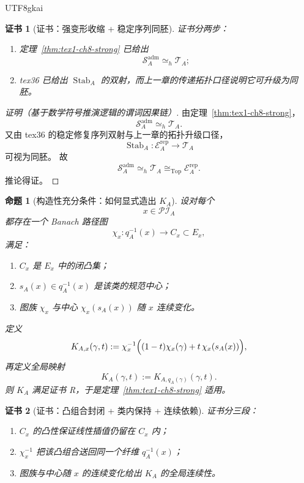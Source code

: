 \documentclass[12pt]{article}
\newtheorem{proposition}{命题}[section]
\newtheorem{Certificate}{证书}[section]
\begin{document}
\begin{CJK*}{UTF8}{gkai}
\begin{Certificate}[证书：强变形收缩 + 稳定序列同胚]
\label{cert:tex1-ch8-rep}
证书分两步：
\begin{enumerate}
  \item 定理~\ref{thm:tex1-ch8-strong} 已给出
  \[
    \mathcal S_A^{\mathrm{adm}}\simeq_h \mathcal T_A;
  \]
  \item tex36 已给出 \(\operatorname{Stab}_A\) 的双射，而上一章的传递拓扑口径说明它可升级为同胚。
\end{enumerate}
\end{Certificate}

\begin{proof}[证明（基于数学符号推演逻辑的谓词因果链）]
由定理~\ref{thm:tex1-ch8-strong}，
\[
  \mathcal S_A^{\mathrm{adm}}\simeq_h \mathcal T_A.
\]
又由 tex36 的稳定修复序列双射与上一章的拓扑升级口径，
\[
  \operatorname{Stab}_A:\mathcal E_A^{\mathrm{rep}}\to \mathcal T_A
\]
可视为同胚。
故
\[
  \mathcal S_A^{\mathrm{adm}}
  \simeq_h
  \mathcal T_A
  \cong_{\mathrm{Top}}
  \mathcal E_A^{\mathrm{rep}}.
\]
推论得证。
\end{proof}

\begin{proposition}[构造性充分条件：如何显式造出 \(K_A\)]
\label{prop:tex1-ch8-constructive}
设对每个
\[
  x\in \mathcal{PI}_A
\]
都存在一个 Banach 路径图
\[
  \chi_x:q_A^{-1}(x)\to C_x\subset E_x,
\]
满足：
\begin{enumerate}
  \item \(C_x\) 是 \(E_x\) 中的闭凸集；
  \item \(s_A(x)\in q_A^{-1}(x)\) 是该类的规范中心；
  \item 图族 \(\chi_x\) 与中心 \(\chi_x(s_A(x))\) 随 \(x\) 连续变化。
\end{enumerate}
定义
\[
  K_{A,x}(\gamma,t)
  :=
  \chi_x^{-1}
  \Bigl(
    (1-t)\chi_x(\gamma)+t\,\chi_x(s_A(x))
  \Bigr),
\]
再定义全局映射
\[
  K_A(\gamma,t)
  :=
  K_{A,q_A(\gamma)}(\gamma,t).
\]
则 \(K_A\) 满足证书 R，于是定理~\ref{thm:tex1-ch8-strong} 适用。
\end{proposition}

\begin{Certificate}[证书：凸组合封闭 + 类内保持 + 连续依赖]
\label{cert:tex1-ch8-constructive}
证书分三段：
\begin{enumerate}
  \item \(C_x\) 的凸性保证线性插值仍留在 \(C_x\) 内；
  \item \(\chi_x^{-1}\) 把该凸组合送回同一个纤维 \(q_A^{-1}(x)\)；
  \item 图族与中心随 \(x\) 的连续变化给出 \(K_A\) 的全局连续性。
\end{enumerate}
\end{Certificate}


\end{CJK*}
\end{document}
